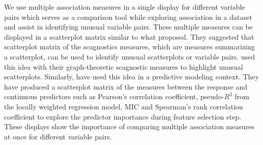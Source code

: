 We use multiple association measures in a single display for different
variable pairs which serves as a comparison tool while exploring
association in a dataset and assist in identifying unusual variable
pairs. These multiple measures can be displayed in a scatterplot matrix
similar to what \citet{tukey1985computer} proposed. They suggested that
scatterplot matrix of the scagnostics measures, which are measures
summarizing a scatterplot, can be used to identify unusual scatterplots
or variable pairs. \citet{wilkinson2005graph} used this idea with their
graph-theoretic scagnostic measures to highlight unusual scatterplots.
Similarly, \citet{kuhn2013applied} have used this idea in a predictive
modeling context. They have produced a scatterplot matrix of the
measures between the response and continuous predictors such as
Pearson's correlation coefficient, pseudo-\(R^2\) from the locally
weighted regression model, MIC and Spearman's rank correlation
coefficient to explore the predictor importance during feature selection
step. These displays show the importance of comparing multiple
association measures at once for different variable pairs.



\address{%
Amit Chinwan\\
Maynooth University\\%
Hamilton Institute\\ Maynooth, Ireland\\
%
%
%
\href{mailto:amit.chinwan.2019@mumail.ie}{\nolinkurl{amit.chinwan.2019@mumail.ie}}%
}

\address{%
Catherine Hurley\\
Maynooth University\\%
Department of Mathematics and Statistics\\ Maynooth, Ireland\\
%
%
%
\href{mailto:catherine.hurley@mu.ie}{\nolinkurl{catherine.hurley@mu.ie}}%
}
